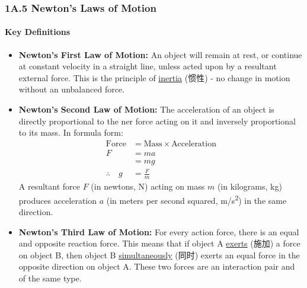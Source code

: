 
\subsubsection{1A.5 Newton's Laws of Motion}
\paragraph{Key Definitions}
\begin{itemize}
    \item \textbf{Newton's First Law of Motion:} An object will remain at rest, or continue at constant velocity in a straight
    line, unless acted upon by a resultant external force. This is the principle of \underline{inertia} (惯性) - no change in
    motion without an unbalanced force.
    \item \textbf{Newton's Second Law of Motion:} The acceleration of an object is directly proportional to the ner force acting
    on it and inversely proportional to its mass. In formula form:
    \begin{equation*}
        \begin{split}
            \text{Force} &= \text{Mass} \times \text{Acceleration} \\
            F &= ma \\
            &= mg \\
            \therefore \quad g &= \frac{F}{m}
        \end{split}
    \end{equation*}
    A resultant force $F$ (in newtons, \unit{N}) acting on mass $m$ (in kilograms, \unit{kg}) produces acceleration $a$ (in
    meters per second squared, \unit{m/s^2}) in the same direction.
    \item \textbf{Newton's Third Law of Motion:} For every action force, there is an equal and opposite reaction force. This
    means that if object A \underline{exerts} (施加) a force on object B, then object B \underline{simultaneously} (同时) exerts
    an equal force in the opposite direction on object A. These two forces are an interaction pair and of the same type.
\end{itemize}

